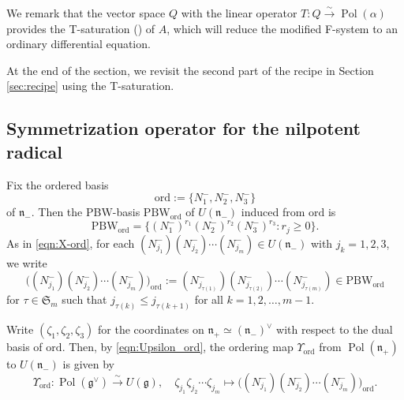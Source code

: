 \documentclass[a4paper,11pt,reqno]{amsart}
\newcommand{\frakg}{\mathfrak{g}}
\newcommand{\frakn}{\mathfrak{n}}
\newcommand{\0}{{\bf 0}}
\newcommand{\1}{{\bf 1}}
\DeclareMathOperator{\Pol}{Pol}
\newcommand{\ord}{{\mathrm{ord}}}
\DeclareMathOperator{\To}{\longrightarrow}
\theoremstyle{plain}
\theoremstyle{definition}
\numberwithin{equation}{section}
\theoremstyle{definition}
\begin{document}
We remark that the vector space $Q$ with the linear operator 
$T\colon Q \stackrel{\sim}{\to} \Pol(\alpha)$
provides the T-saturation (\cite[Sec.\ 3.2]{KoPe16b}) of $A$, which will reduce the modified F-system to an ordinary differential equation.

At the end of the section,
we revisit the second part of the recipe 
in Section \ref{sec:recipe} using the T-saturation.


\subsection{Symmetrization operator for the nilpotent radical}
\label{sec:Upn}

Fix the ordered basis 
\begin{equation}\label{eqn:ord_nilpotent}
\ord:=\{N_1^-, N_2^-, N_3^-\}
\end{equation}
of $\mathfrak{n}_-$. Then the PBW-basis $\mathrm{PBW}_\ord$
of $U(\frakn_-)$ induced from $\ord$ is 
\begin{equation*}
\mathrm{PBW}_\ord=\{(N_1^-)^{r_1}(N_2^-)^{r_2}(N_3^-)^{r_3}: r_j \geq 0\}.
\end{equation*}
As in \eqref{eqn:X-ord}, for each $(N_{j_1}^-)(N_{j_2}^-)\cdots (N_{j_m}^-) \in U(\frakn_-)$ with $j_k=1,2,3$, we write
\begin{equation*}
\big( (N_{j_1}^-)(N_{j_2}^-)\cdots (N_{j_m}^-) \big)_\ord
:=
(N_{j_{\tau(1)}}^-)(N_{j_{\tau(2)}}^-)\cdots (N_{j_{\tau(m)}}^-)
\in \mathrm{PBW}_\ord
\end{equation*}
for $\tau \in \mathfrak{S}_m$ such that $j_{\tau(k)} \leq j_{\tau(k+1)}$
for all $k=1,2,\ldots, m-1$.

Write $(\zeta_1, \zeta_2, \zeta_3)$ for the coordinates 
on $\frakn_+\simeq (\frakn_-)^\vee$ with respect to the 
dual basis of $\ord$.
Then, by \eqref{eqn:Upsilon_ord},
the ordering map $\Upsilon_\ord$ from $\Pol(\frakn_+)$ to 
$U(\mathfrak{n}_-)$ is given by
\begin{equation}\label{eqn:upsilon_ord2}
\Upsilon_{\ord} \colon \Pol(\frakg^\vee) \stackrel{\sim}{\To} U(\frakg), \quad 
\zeta_{j_1}\zeta_{j_2}\cdots \zeta_{j_m} 
\longmapsto
\big((N_{j_1}^-)(N_{j_2}^-)\cdots (N_{j_m}^-) \big)_\ord.
\end{equation}
\end{document}
